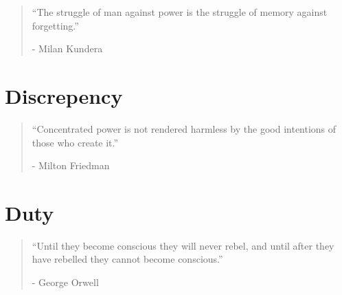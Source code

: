 \vspace{-1.3cm}
\begin{localsize}{10}
	\begin{quote}
		“The struggle of man against power is the struggle of memory against forgetting.”
		\begin{flushright}- Milan Kundera \end{flushright}
	\end{quote} 
\end{localsize}
\vspace{1cm}

\chapter{Discrepency} %

\vspace{-1.3cm}
\begin{localsize}{10}
	\begin{quote}
	“Concentrated power is not rendered harmless by the good intentions of those who create it.” 
		\begin{flushright}- Milton Friedman \end{flushright}	
	\end{quote} 
\end{localsize}
\vspace{1cm}

\chapter{Duty} %

\vspace{-1.3cm}
\begin{localsize}{10}
	\begin{quote}
		“Until they become conscious they will never rebel, and until after they have rebelled they cannot become conscious.”
		\begin{flushright}- George Orwell \end{flushright}
	\end{quote} 
\end{localsize}
\vspace{1cm}

